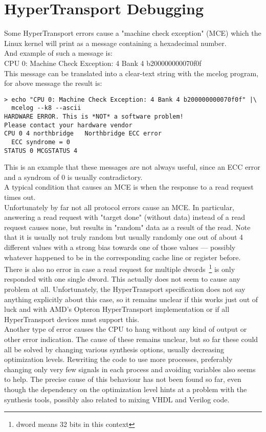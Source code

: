 \chapter{HyperTransport Debugging}
Some HyperTransport errors cause a "machine check exception" (MCE) which
the Linux kernel will print as a message containing a hexadecimal
number.\\
And example of such a message is:\\
CPU 0: Machine Check Exception: 4 Bank 4 b200000000070f0f\\
This message can be translated into a clear-text string
with the mcelog program, for above message the result is:\\
\begin{verbatim}
> echo "CPU 0: Machine Check Exception: 4 Bank 4 b200000000070f0f" |\
  mcelog --k8 --ascii
HARDWARE ERROR. This is *NOT* a software problem!
Please contact your hardware vendor
CPU 0 4 northbridge   Northbridge ECC error
  ECC syndrome = 0
STATUS 0 MCGSTATUS 4
\end{verbatim}
This is an example that these messages are not always useful, since
an ECC error and a syndrom of 0 is usually contradictory.\\
A typical condition that causes an MCE is when the response
to a read request times out.\\
Unfortunately by far not all protocol errors cause an MCE. In particular,
answering a read request with "target done" (without data) instead of
a read request causes none, but results in "random" data as a result
of the read.
Note that it is usually not truly random but usually randomly one out of
about 4 different values with a strong bias towards one of those values
--- possibly whatever happened to be in the corresponding cache line or
register before.\\
There is also no error in case a read request for multiple
dwords~\footnote{dword means 32 bits in this context}
is only responded with one single dword.
This actually does not seem to cause any problem at all.
Unfortunately, the HyperTransport specification does
not say anything explicitly about this case, so it remains unclear if
this works just out of luck and with AMD's Opteron HyperTransport
implementation or if all HyperTransport devices must support this.\\
Another type of error causes the CPU to hang without any kind of output
or other error indication.
The cause of these remains unclear, but so far these could all be solved
by changing various synthesis options, usually decreasing optimization
levels.
Rewriting the code to use more processes, preferably changing only
very few signals in each process and avoiding variables also seems to
help.
The precise cause of this behaviour has not been found so far,
even though the dependency on the optimization level hints at a problem
with the synthesis tools, possibly also related to mixing VHDL and
Verilog code.
